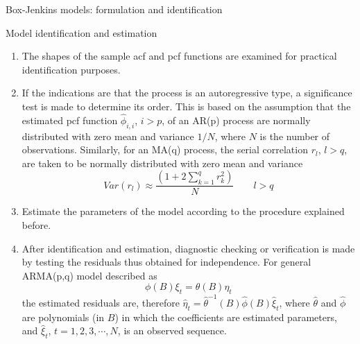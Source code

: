 \documentclass[8pt]{beamer}
\renewcommand{\emph}[1]{\textcolor{myorange}{#1}}
\begin{document}
 \begin{frame}{Box-Jenkins models: formulation and identification}
    \begin{block}{Model identification and estimation}
    \end{block}
    \begin{enumerate}
        \item The shapes of the sample \emph{acf} and \emph{pcf} functions are examined for practical identification purposes. 
        \item If  the indications are that the process is an \emph{autoregressive} type, a \emph{significance test} is made to determine its order. This is based on the assumption that the estimated \emph{pcf} function $\hat{\phi}_{i,i}$, $i>p$, of an \emph{AR(p)} process are normally distributed with zero mean and variance  $1/N$, where $N$ is the number of observations. Similarly, for an \emph{MA(q)} process, the \emph{serial correlation} $r_l$, $l>q$, are taken to be \emph{normally distributed}  with zero mean and variance 
            \begin{equation}
                Var(r_l) \approx \frac{\left( 1+2\sum_{k=1}^q r_k^2 \right)}{N} \quad \quad l > q
            \end{equation}
        \item Estimate the parameters of the model according to the procedure explained before. 
        \item After \emph{identification} and \emph{estimation}, \emph{diagnostic checking} or \emph{verification} is made by testing the residuals thus obtained for independence. For general \emph{ARMA(p,q)} model described as
            \[
                \phi (B) \xi_t = \theta (B) \eta_t
            \]
            the estimated residuals are, therefore $\hat{\eta}_t = \hat{\theta}^{-1} (B) \hat{\phi} (B) \hat{\xi}_t$, where $\hat{\theta}$ and $\hat{\phi}$ are polynomials (in $B$) in which the coefficients are estimated parameters, and $\hat{\xi}_t$, $t=1,2,3,\cdots,N$, is an observed sequence. 
   \end{enumerate}
\end{frame}
\end{document}
